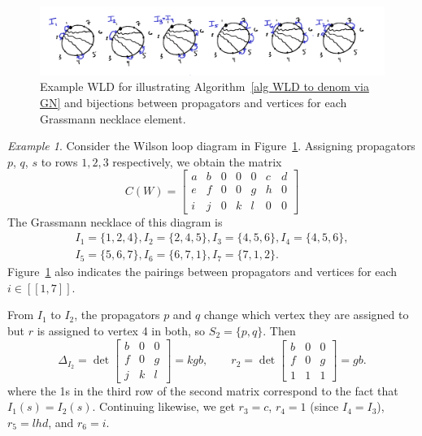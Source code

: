 \documentclass[11pt]{article}
\newcommand{\interval}[2]{[\![#1,#2]\!]}
\theoremstyle{remark}
\newtheorem{eg}[thm]{Example}
\theoremstyle{definition}
\begin{document}
\begin{figure}
\includegraphics{egWLD_forR}
\caption{Example WLD for illustrating Algorithm~\ref{alg WLD to denom via GN} and bijections between propagators and vertices for each Grassmann necklace element.}\label{fig R eg}
\end{figure}

\begin{eg}
Consider the Wilson loop diagram in Figure~\ref{fig R eg}. Assigning propagators $p$, $q$, $s$ to rows $1,2,3$ respectively, we obtain the matrix
\[
C(W) = \begin{bmatrix} a & b & 0 & 0 & 0 & c & d \\ e & f & 0 & 0 & g & h & 0 \\ i & j & 0 & k & l & 0 & 0 \end{bmatrix}
\]
The Grassmann necklace of this diagram is 
\begin{gather*}I_1 = \{1,2,4\}, I_2 = \{2,4,5\}, I_3 = \{4,5,6\}, I_4=\{4,5,6\},\\ I_5=\{5,6,7\}, I_6 = \{6,7,1\}, I_7=\{7,1,2\}. \end{gather*}  
Figure~\ref{fig R eg} also indicates the pairings between propagators and vertices for each $i \in \interval{1}{7}$.  

From $I_1$ to $I_2$, the propagators $p$ and $q$ change which vertex they are assigned to but $r$ is assigned to vertex 4 in both, so $S_2 = \{p,q\}$.  Then
\[
\Delta_{I_2}=\det\begin{bmatrix} b & 0 & 0 \\ f & 0 & g \\ j & k & l \end{bmatrix} = kgb, \qquad r_2 = \det\begin{bmatrix} b & 0 & 0 \\ f & 0 & g \\ 1 & 1 & 1 \end{bmatrix} = gb.
\]
where the 1s in the third row of the second matrix correspond to the fact that $I_1(s) = I_2(s)$.  Continuing likewise, we get $r_3 = c$, $r_4=1$ (since $I_4 = I_3$), $r_5 = lhd$, and $r_6 = i$.


\end{eg}
\end{document}

